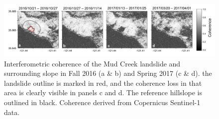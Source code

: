 \documentclass[nhess, manuscript]{copernicus}
\begin{document}
\begin{figure}[hbt!]
    \centering
    \includegraphics[width = \textwidth]{coherence_evolution_1.pdf}
    \caption{Interferometric coherence of the Mud Creek landslide and surrounding slope in Fall 2016 (a \& b) and Spring 2017 (c \& d). the landslide outline is marked in red, and the coherence loss in that area is clearly visible in panels c and d. The reference hillslope is outlined in black. Coherence derived from Copernicus Sentinel-1 data.}
    \label{fig:coh_evolution}
\end{figure}
\end{document}
